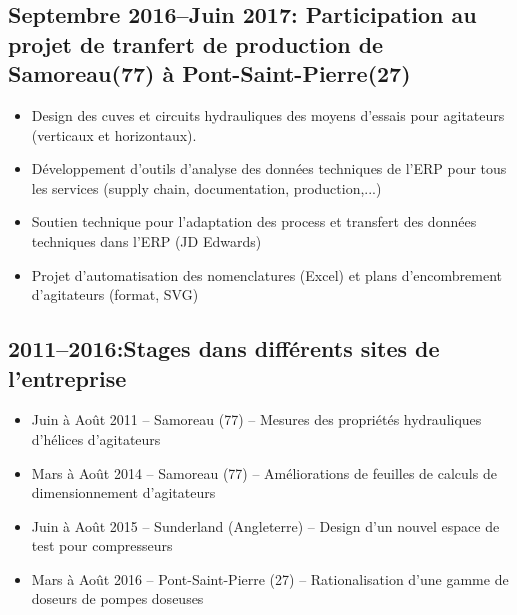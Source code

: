 \documentclass[10pt,a4paper,sans]{article}
\begin{document}
\begin{minipage}{0.75\textwidth}
    \subsection{Septembre 2016--Juin 2017: Participation au projet de tranfert de production de Samoreau(77) à Pont-Saint-Pierre(27)}
    \begin{itemize}
        \item Design des cuves et circuits hydrauliques des moyens d’essais pour agitateurs (verticaux et horizontaux).
        \item Développement d’outils d’analyse des données techniques de l’ERP pour tous les services (supply chain, documentation, production,...)
        \item Soutien technique pour l’adaptation des process et transfert des données techniques dans l’ERP (JD Edwards)
        \item Projet d’automatisation des nomenclatures (Excel) et plans d’encombrement d’agitateurs (format, SVG)
    \end{itemize}


    \subsection{2011--2016:Stages dans différents sites de l'entreprise}
    \begin{itemize}
        \item Juin à Août 2011 – Samoreau (77) – Mesures des propriétés hydrauliques d’hélices d’agitateurs
        \item Mars à Août 2014 – Samoreau (77) – Améliorations de feuilles de calculs de dimensionnement d’agitateurs
        \item Juin à Août 2015 – Sunderland (Angleterre) – Design d’un nouvel espace de test pour compresseurs
        \item Mars à Août 2016 – Pont-Saint-Pierre (27) – Rationalisation d’une gamme de doseurs de pompes doseuses
    \end{itemize}
\end{minipage}
\end{document}
